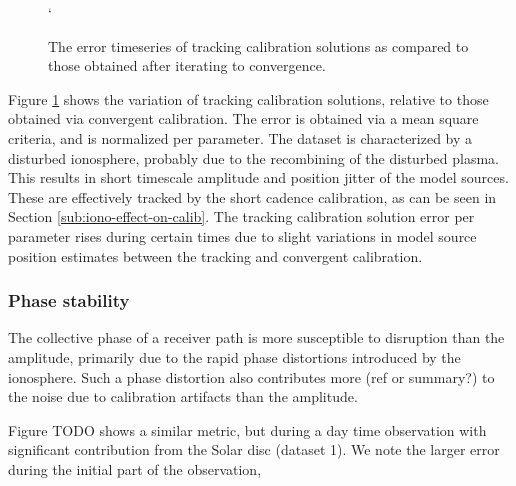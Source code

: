 \documentclass{aa}
\begin{document}
\begin{figure}[tbh]
`\caption{\label{fig:The-error-timeseries}The error timeseries of tracking
calibration solutions as compared to those obtained after iterating
to convergence. }
\end{figure}


Figure   \ref{fig:The-error-timeseries}   shows   the  variation   of   tracking
calibration solutions,  relative to  those obtained via  convergent calibration.
The  error  is obtained  via  a  mean square  criteria,  and  is normalized  per
parameter. The dataset is characterized  by a disturbed ionosphere, probably due
to  the recombining of  the disturbed  plasma. This  results in  short timescale
amplitude  and position  jitter of  the  model sources.   These are  effectively
tracked  by  the   short  cadence  calibration,  as  can   be  seen  in  Section
\ref{sub:iono-effect-on-calib}.  The  tracking  calibration solution  error  per
parameter rises  during certain times due  to slight variations  in model source
position estimates between the tracking and convergent calibration.


\subsubsection{Phase stability}

The collective phase  of a receiver path is more  susceptible to disruption than
the amplitude,  primarily due to the  rapid phase distortions  introduced by the
ionosphere. Such a  phase distortion also contributes more  (ref or summary?) to
the noise due to calibration artifacts than the amplitude.

Figure  TODO shows  a similar  metric, but  during a  day time  observation with
significant contribution  from the  Solar disc (dataset  1). We note  the larger
error during the initial part of the observation,
\end{document}
